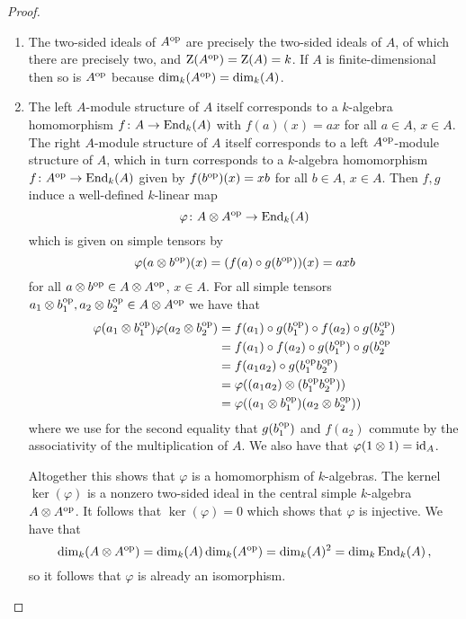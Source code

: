\begin{proof}
  \leavevmode
  \begin{enumerate}
    \item
      The two-sided ideals of $A^{\operatorname{op}}$ are precisely the two-sided ideals of $A$, of which there are precisely two, and $\operatorname{Z}(A^{\operatorname{op}}) = \operatorname{Z}(A) = k$.
      If $A$ is finite-dimensional then so is $A^{\operatorname{op}}$ because $\dim_k(A^{\operatorname{op}}) = \dim_k(A)$.
    \item
      The left $A$-module structure of $A$ itself corresponds to a $k$-algebra homomorphism $f \colon A \to \operatorname{End}_k(A)$ with $f(a)(x) = ax$ for all $a \in A$, $x \in A$.
      The right $A$-module structure of $A$ itself corresponds to a left $A^{\operatorname{op}}$-module structure of $A$, which in turn corresponds to a $k$-algebra homomorphism $f \colon A^{\operatorname{op}} \to \operatorname{End}_k(A)$ given by $f(b^{\operatorname{op}})(x) = xb$ for all $b \in A$, $x \in A$.
      Then $f, g$ induce a well-defined $k$-linear map
      \[
                \varphi
        \colon  A \mathbin{\otimes} A^{\operatorname{op}}
        \to     \operatorname{End}_k(A)
      \]
      which is given on simple tensors by
      \[
          \varphi(a \mathbin{\otimes} b^{\operatorname{op}})(x)
        = (f(a) \circ g(b^{\operatorname{op}}))(x)
        = a x b
      \]
      for all $a \mathbin{\otimes} b^{\operatorname{op}} \in A \mathbin{\otimes} A^{\operatorname{op}}$, $x \in A$.
      For all simple tensors $a_1 \mathbin{\otimes} b_1^{\operatorname{op}}, a_2 \mathbin{\otimes} b_2^{\operatorname{op}} \in A \mathbin{\otimes} A^{\operatorname{op}}$ we have that
      \begin{align*}
            \varphi(a_1 \mathbin{\otimes} b_1^{\operatorname{op}}) \varphi(a_2 \mathbin{\otimes} b_2^{\operatorname{op}})
        &=  f(a_1) \circ g(b_1^{\operatorname{op}}) \circ f(a_2) \circ g(b_2^{\operatorname{op}}) \\
        &=  f(a_1) \circ f(a_2) \circ g(b_1^{\operatorname{op}}) \circ g(b_2^{\operatorname{op}}  \\
        &=  f(a_1 a_2) \circ g(b_1^{\operatorname{op}} b_2^{\operatorname{op}})                   \\
        &=  \varphi((a_1 a_2) \mathbin{\otimes} (b_1^{\operatorname{op}} b_2^{\operatorname{op}}))          \\
        &=  \varphi((a_1 \mathbin{\otimes} b_1^{\operatorname{op}}) (a_2 \mathbin{\otimes} b_2^{\operatorname{op}}))
      \end{align*}
      where we use for the second equality that $g(b_1^{\operatorname{op}})$ and $f(a_2)$ commute by the associativity of the multiplication of $A$.
      We also have that $\varphi(1 \mathbin{\otimes} 1) = \operatorname{id}_A$.
      
      Altogether this shows that $\varphi$ is a homomorphism of $k$-algebras.
      The kernel $\ker(\varphi)$ is a nonzero two-sided ideal in the central simple $k$-algebra $A \mathbin{\otimes} A^{\operatorname{op}}$.
      It follows that $\ker(\varphi) = 0$ which shows that $\varphi$ is injective.
      We have that
      \[
          \dim_k (A \mathbin{\otimes} A^{\operatorname{op}})
        = \dim_k(A) \dim_k(A^{\operatorname{op}})
        = \dim_k(A)^2
        = \dim_k \operatorname{End}_k(A) \,,
      \]
      so it follows that $\varphi$ is already an isomorphism.
    \qedhere
  \end{enumerate}
\end{proof}



